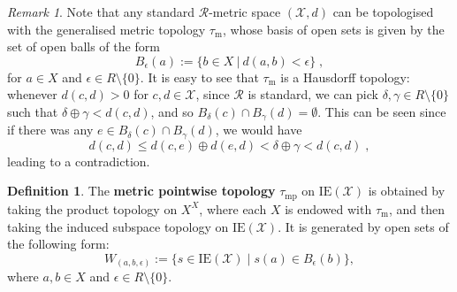 \documentclass{article}
\theoremstyle{remark}
\newtheorem{remark}[theorem]{Remark}
\theoremstyle{definition}
\newtheorem{definition}[theorem]{Definition}
\newcommand{\mpw}[0]{\tau_{\mathrm{mp}}}
\renewcommand\leq{\leqslant}
\newcommand{\rr}[0]{\mathcal{R}}
\newcommand{\ie}[0]{\mathrm{IE}}
\begin{document}
{{{{{\begin{remark} Note that any standard $\rr$-metric space $(\mathcal{X}, d)$ can be topologised with the generalised metric topology $\tau_{\mathrm{m}}$, whose basis of open sets is given by the set of open balls of the form 
\[B_\epsilon(a):=\{b\in X\ \vert \ d(a,b)<\epsilon\}\;,\]
for $a\in X$ and $\epsilon\in R\setminus\{0\}$. It is easy to see that $\tau_{\mathrm{m}}$ is a Hausdorff topology:  whenever $d(c,d)>0$ for $c,d\in\mathcal{X}$, since $\rr$ is standard, we can pick $\delta, \gamma \in R\setminus\{0\}$
 such that $\delta\oplus\gamma<d(c,d)$, and so $B_\delta(c)\cap B_\gamma(d)=\emptyset$. This can be seen  since if there was any $e\in B_\delta(c)\cap B_\gamma(d)$, we would have
 \[d(c,d)\leq d(c,e)\oplus d(e,d)<\delta\oplus\gamma<d(c,d)\;,\]
 leading to a contradiction. 
 \end{remark}



 \begin{definition}The \textbf{metric pointwise topology} $\mpw$ on $\ie(\mathcal{X})$ is obtained by taking the product topology on $X^X$, where each $X$ is endowed with $\tau_{\mathrm{m}}$, and then taking the induced subspace topology on $\ie(\mathcal{X})$. It is generated by open sets of the following form:
\[W_{(a, b, \epsilon)}:=\{s\in {\ie(\mathcal{X})}
\;
\vert \; s(a)\in B_\epsilon(b)\},\]
where $a,b\in X$  and  $\epsilon\in R \setminus\{0\}$. 
\end{definition}



}}}}}
\end{document}
